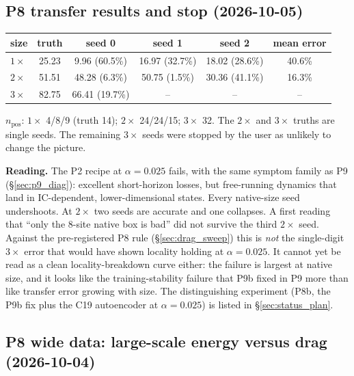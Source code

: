 \documentclass[11pt]{article}
\begin{document}
\subsection{P8 transfer results and stop (2026-10-05)}
\label{sec:p8_transfer}

\begin{center}
\small
\begin{tabular}{lccccc}
\toprule
size & truth & seed 0 & seed 1 & seed 2 & mean error \\
\midrule
$1\times$ & 25.23 & 9.96 (60.5\%) & 16.97 (32.7\%) & 18.02 (28.6\%) & 40.6\% \\
$2\times$ & 51.51 & 48.28 (6.3\%) & 50.75 (1.5\%) & 30.36 (41.1\%) & 16.3\% \\
$3\times$ & 82.75 & 66.41 (19.7\%) & -- & -- & -- \\
\bottomrule
\end{tabular}
\end{center}
$n_{\mathrm{pos}}$: $1\times$ 4/8/9 (truth 14); $2\times$ 24/24/15;
$3\times$ 32. The $2\times$ and $3\times$ truths are single seeds. The
remaining $3\times$ seeds were stopped by the user as unlikely to change
the picture.

\textbf{Reading.} The P2 recipe at $\alpha{=}0.025$ fails, with the same
symptom family as P9 (\S\ref{sec:p9_diag}): excellent short-horizon
losses, but free-running dynamics that land in IC-dependent,
lower-dimensional states. Every native-size seed undershoots. At
$2\times$ two seeds are accurate and one collapses. A first reading
that ``only the 8-site native box is bad'' did not survive the third
$2\times$ seed. Against the pre-registered P8 rule (\S\ref{sec:drag_sweep})
this is \emph{not} the single-digit $3\times$ error that would have
shown locality holding at $\alpha{=}0.025$. It cannot yet be read as a
clean locality-breakdown curve either: the failure is largest at
native size, and it looks like the training-stability failure that P9b
fixed in P9 more than like transfer error growing with size. The
distinguishing experiment (P8b, the P9b fix plus the C19 autoencoder at
$\alpha{=}0.025$) is listed in \S\ref{sec:status_plan}.

\subsection{P8 wide data: large-scale energy versus drag (2026-10-04)}
\label{sec:p8_largescale}
\end{document}
